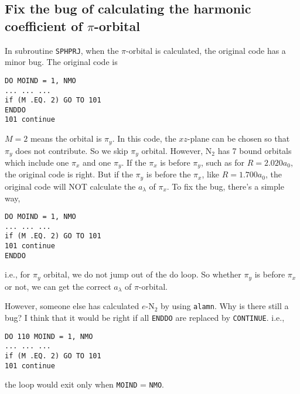 \documentclass[aps,pra,groupedaddress,
                amsfonts,amssymb,
                preprint
    ]{revtex4}
\newcommand{\code}[1]{\texttt{#1}}
\begin{document}
\subsection{Fix the bug of calculating the harmonic coefficient of $\pi$-orbital}
\label{sec:fix-bug-calculating}
In subroutine \code{SPHPRJ}, when the $\pi$-orbital is calculated, the
original code has a minor bug. The original code is
\begin{verbatim}
DO MOIND = 1, NMO
... ... ...
if (M .EQ. 2) GO TO 101
ENDDO
101 continue
\end{verbatim}
$M = 2$ means the orbital is $\pi_y$. In this code, the $xz$-plane can
be chosen so that $\pi_y$ does not contribute. So we skip $\pi_y$
orbital. However, N$_2$ has 7 bound orbitals which include one $\pi_x$
and one $\pi_y$. If the $\pi_x$ is before $\pi_y$, such as for $R=2.020
a_0$, the original code is right. But if the $\pi_y$ is before the
$\pi_x$, like $R=1.700 a_0$, the original code will NOT calculate the
$a_\lambda$ of $\pi_x$. To fix the bug, there's a simple way,
\begin{verbatim}
DO MOIND = 1, NMO
... ... ...
if (M .EQ. 2) GO TO 101
101 continue
ENDDO
\end{verbatim}
i.e., for $\pi_y$ orbital, we do not jump out of the do loop. So whether
$\pi_y$ is before $\pi_x$ or not, we can get the correct $a_\lambda$ of
$\pi$-orbital. 

However, someone else has calculated $e$-N$_2$ by using \code{alamn}.
Why is there still a bug? I think that it would be right if all
\code{ENDDO} are replaced by \code{CONTINUE}. i.e., 
\begin{verbatim}
DO 110 MOIND = 1, NMO
... ... ...
if (M .EQ. 2) GO TO 101
101 continue
\end{verbatim}
the loop would exit only when \code{MOIND} = \code{NMO}.
\end{document}
